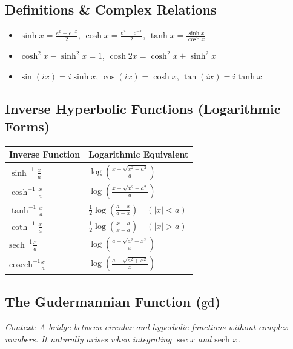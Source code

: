 \documentclass[11pt, a4paper]{article}
\begin{document}
\subsection*{\color{secondary} Definitions \& Complex Relations}
\begin{itemize}[leftmargin=*, nosep]
    \item $\sinh x = \frac{e^x - e^{-x}}{2}$, $\cosh x = \frac{e^x + e^{-x}}{2}$, $\tanh x = \frac{\sinh x}{\cosh x}$
    \item $\cosh^2 x - \sinh^2 x = 1$, $\cosh 2x = \cosh^2 x + \sinh^2 x$
    \item $\sin(ix) = i \sinh x$, $\cos(ix) = \cosh x$, $\tan(ix) = i \tanh x$
\end{itemize}

\subsection*{\color{secondary} Inverse Hyperbolic Functions (Logarithmic Forms)}
\begin{center}
\begin{tabular}{@{}p{} p{}@{}}
\toprule
\textbf{Inverse Function} & \textbf{Logarithmic Equivalent} \\
\midrule
$\sinh^{-1} \frac{x}{a}$ & $\log \left( \frac{x + \sqrt{x^2+a^2}}{a} \right)$ \\
$\cosh^{-1} \frac{x}{a}$ & $\log \left( \frac{x + \sqrt{x^2-a^2}}{a} \right)$ \\
$\tanh^{-1} \frac{x}{a}$ & $\frac{1}{2} \log \left( \frac{a+x}{a-x} \right) \quad (|x| < a)$ \\
$\coth^{-1} \frac{x}{a}$ & $\frac{1}{2} \log \left( \frac{x+a}{x-a} \right) \quad (|x| > a)$ \\
$\text{sech}^{-1} \frac{x}{a}$ & $\log \left( \frac{a + \sqrt{a^2-x^2}}{x} \right)$ \\
$\text{cosech}^{-1} \frac{x}{a}$ & $\log \left( \frac{a + \sqrt{a^2+x^2}}{x} \right)$ \\
\bottomrule
\end{tabular}
\end{center}

\vspace{0.3cm}

\subsection*{\color{secondary} The Gudermannian Function ($\text{gd}$)}
\textit{\small Context: A bridge between circular and hyperbolic functions without complex numbers. It naturally arises when integrating $\sec x$ and $\text{sech } x$.}
\vspace{0.15cm}
\end{document}
